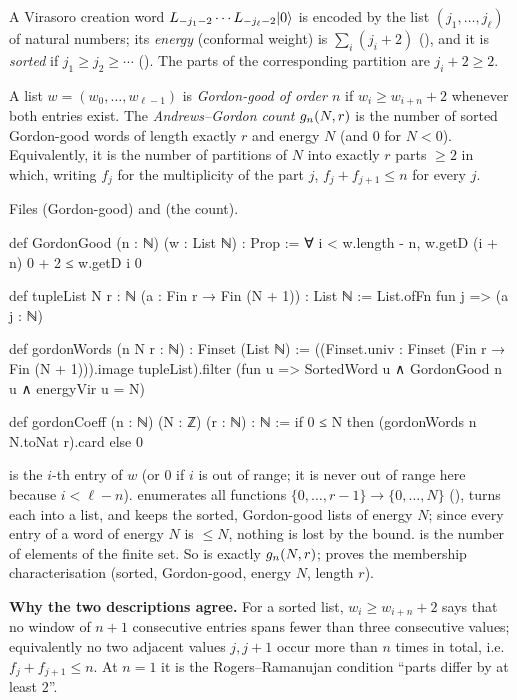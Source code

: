 A Virasoro creation word $L_{-j_1-2}\cdots L_{-j_\ell-2}|0\rangle$ is encoded by the list $(j_1,\dots,j_\ell)$
of natural numbers; its \emph{energy} (conformal weight) is $\sum_i(j_i+2)$ (), and it is
\emph{sorted} if $j_1\ge j_2\ge\cdots$ (). The parts of the corresponding partition are $j_i+2\ge2$.

\begin{definition}\label{l29:def:gordon}
A list $w=(w_0,\dots,w_{\ell-1})$ is \emph{Gordon-good of order $n$} if $w_i\ge w_{i+n}+2$ whenever both entries
exist. The \emph{Andrews--Gordon count} $g_n(N,r)$ is the number of sorted Gordon-good words of length
exactly $r$ and energy $N$ (and $0$ for $N<0$). Equivalently, it is the number of partitions of $N$ into exactly $r$
parts $\ge2$ in which, writing $f_j$ for the multiplicity of the part $j$, $f_j+f_{j+1}\le n$ for every $j$.
\end{definition}

\noindent Files  (Gordon-good) and
 (the count).
\begin{leancode}
def GordonGood (n : ℕ) (w : List ℕ) : Prop :=
  ∀ i < w.length - n, w.getD (i + n) 0 + 2 ≤ w.getD i 0

def tupleList {N r : ℕ} (a : Fin r → Fin (N + 1)) : List ℕ := List.ofFn fun j => (a j : ℕ)

def gordonWords (n N r : ℕ) : Finset (List ℕ) :=
  ((Finset.univ : Finset (Fin r → Fin (N + 1))).image tupleList).filter
    (fun u => SortedWord u ∧ GordonGood n u ∧ energyVir u = N)

def gordonCoeff (n : ℕ) (N : ℤ) (r : ℕ) : ℕ :=
  if 0 ≤ N then (gordonWords n N.toNat r).card else 0
\end{leancode}

\begin{dictionary}
 is the $i$-th entry of $w$ (or $0$ if $i$ is out of range; it is never out of range here because
$i<\ell-n$).  enumerates all functions $\{0,\dots,r-1\}\to\{0,\dots,N\}$ (),
turns each into a list, and keeps the sorted, Gordon-good lists of energy $N$; since every entry of a word of energy $N$
is $\le N$, nothing is lost by the bound.  is the number of elements of the finite set. So
 is exactly $g_n(N,r)$;  proves the membership
characterisation (sorted, Gordon-good, energy $N$, length $r$).

\textbf{Why the two descriptions agree.} For a sorted list, $w_i\ge w_{i+n}+2$ says that no window of $n+1$
consecutive entries spans fewer than three consecutive values; equivalently no two adjacent values $j,j+1$ occur more
than $n$ times in total, i.e.\ $f_j+f_{j+1}\le n$. At $n=1$ it is the Rogers--Ramanujan condition ``parts differ by at
least $2$''.
\end{dictionary}

